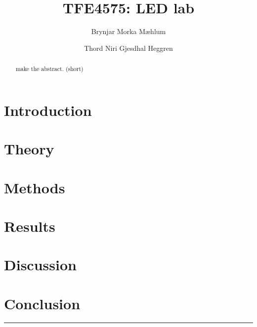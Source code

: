 \documentclass[5p,sort&compress]{elsarticle}
\begin{document}
\begin{frontmatter}

  \title{TFE4575: LED lab}

  \author[fysikk]{Brynjar Morka Mæhlum}
  \author[fysikk]{Thord Niri Gjesdhal Heggren}
  \address[fysikk]{Department of Physics, Norwegian University of Science and Technology, 7491 Trondheim, Norway.}

  \begin{abstract}

    \noindent make the abstract. (short)

  \end{abstract}


\end{frontmatter}

{ %
\hypersetup{linkcolor=purple}

\tableofcontents



\section{Introduction}
\label{intro}



\section{Theory}
\label{theory}



\section{Methods}
\label{methods}




\section{Results}
\label{results}


\section{Discussion}
\label{discussion}



\section{Conclusion}
\label{conclusion}

}
\begingroup
\begin{center}
  \rule{2cm}{.4pt}
\end{center}
\makeatletter
{}
\makeatother



\endgroup
\end{document}
